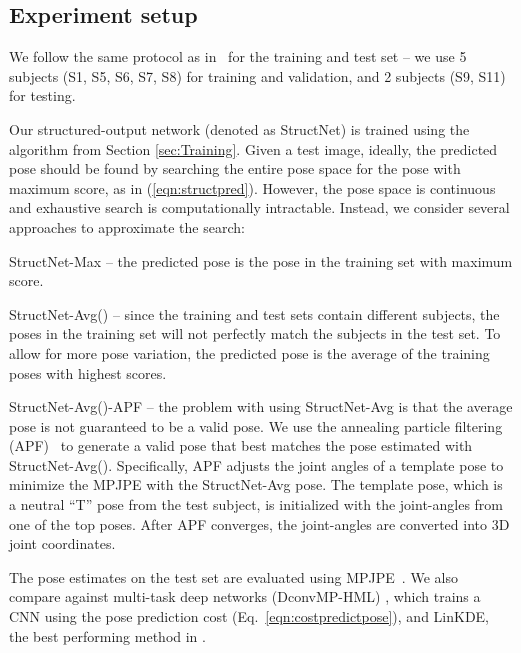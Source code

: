 \documentclass[10pt,twocolumn,letterpaper]{article}
\newcommand{\refeqn}[1]{(\ref{#1})}
\begin{document}
\vspace{-0.15in}
\subsection{Experiment setup}
\vspace{-0.12in}
We follow the same protocol as in~\cite{accv2014} for the training and test set -- we use 5 subjects (S1, S5, S6, S7, S8) for training and validation, and 2 subjects (S9, S11) for testing.

Our structured-output network (denoted as StructNet) is trained using the algorithm from Section \ref{sec:Training}.
Given a test image, ideally, the predicted pose should be found by searching the entire pose space  for the pose with maximum score, as in \refeqn{eqn:structpred}.
However, the pose space is continuous and exhaustive search is computationally intractable.
Instead, we consider several approaches to approximate the search:


\begin{compactitem}
\item StructNet-Max -- the predicted pose is the pose in the training set with maximum score.
\item StructNet-Avg() --  since the training and test sets contain different subjects, the poses in the training 
set will not perfectly match the subjects in the test set. To allow for more pose variation, the predicted pose is the average of the  training poses with highest scores.
\item StructNet-Avg()-APF -- the problem with using StructNet-Avg is that the average pose is not guaranteed to be a valid pose.  We use the annealing particle filtering (APF)~\cite{deutscher2005articulated} to generate a valid pose that best matches the pose estimated with StructNet-Avg().  
Specifically, APF adjusts the joint angles of a template pose to minimize the MPJPE with the StructNet-Avg pose.  The template pose, which is a neutral ``T'' pose from the test subject, 
is initialized with the joint-angles from one of the top  poses.  After APF converges, the joint-angles 
are converted into 3D joint coordinates.
\end{compactitem}
The pose estimates on the test set are evaluated using MPJPE~\cite{h36m_pami}.
We also compare against multi-task deep networks (DconvMP-HML) \cite{accv2014}, which trains a CNN using  the pose prediction cost (Eq.~\ref{eqn:costpredictpose}), and LinKDE, the best performing method in \cite{h36m_pami}.
\end{document}
